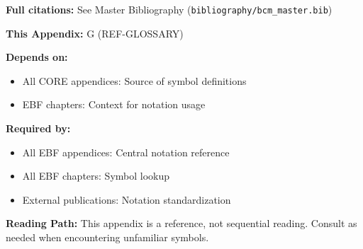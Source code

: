 \textbf{Full citations:} See Master Bibliography (\texttt{bibliography/bcm\_master.bib})


\begin{tcolorbox}[colback=gray!10!white, colframe=gray!75!black,
    title=\textbf{Cross-Reference Footer}]

\textbf{This Appendix:} G (REF-GLOSSARY)

\textbf{Depends on:}
\begin{itemize}[nosep]
    \item All CORE appendices: Source of symbol definitions
    \item EBF chapters: Context for notation usage
\end{itemize}

\textbf{Required by:}
\begin{itemize}[nosep]
    \item All EBF appendices: Central notation reference
    \item All EBF chapters: Symbol lookup
    \item External publications: Notation standardization
\end{itemize}

\textbf{Reading Path:}
This appendix is a reference, not sequential reading.
Consult as needed when encountering unfamiliar symbols.

\end{tcolorbox}

